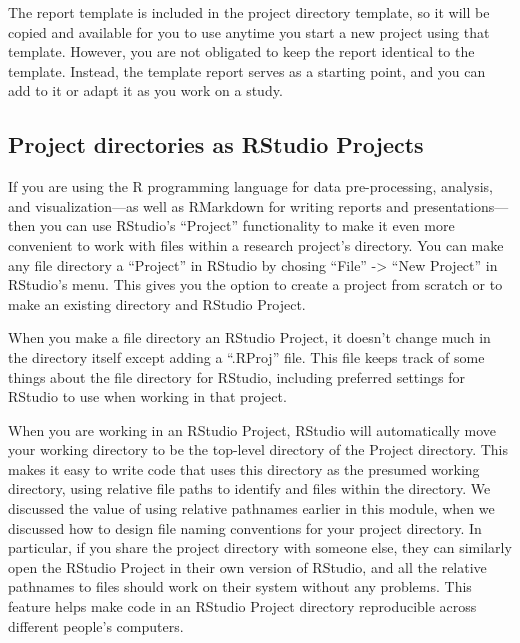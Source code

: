 \documentclass[]{tufte-book}
\begin{document}
The report template is included in the project directory template, so it will be
copied and available for you to use anytime you start a new project using that
template. However, you are not obligated to keep the report identical to the
template. Instead, the template report serves as a starting point, and you can
add to it or adapt it as you work on a study.

\subsection{Project directories as RStudio Projects}\label{project-directories-as-rstudio-projects}

If you are using the R programming language for data pre-processing, analysis,
and visualization---as well as RMarkdown for writing reports and
presentations---then you can use RStudio's ``Project'' functionality to make it
even more convenient to work with files within a research project's directory.
You can make any file directory a ``Project'' in RStudio by chosing ``File'' -\textgreater{}
``New Project'' in RStudio's menu. This gives you the option to create a
project from scratch or to make an existing directory and RStudio Project.

When you make a file directory an RStudio Project, it doesn't change much in
the directory itself except adding a ``.RProj'' file. This file keeps track of
some things about the file directory for RStudio, including preferred settings
for RStudio to use when working in that project.

When you are working in an RStudio Project, RStudio will automatically move your
working directory to be the top-level directory of the Project directory. This
makes it easy to write code that uses this directory as the presumed working
directory, using relative file paths to identify and files within the directory.
We discussed the value of using relative pathnames earlier in this module, when
we discussed how to design file naming conventions for your project directory.
In particular, if you share the project directory with someone else, they can
similarly open the RStudio Project in their own version of RStudio, and all the
relative pathnames to files should work on their system without any problems.
This feature helps make code in an RStudio Project directory reproducible across
different people's computers.
\end{document}
